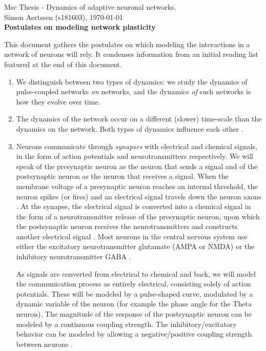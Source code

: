 


Msc Thesis - Dynamics of adaptive neuronal networks. \\
Simon Aertssen (s181603), \today \\ 

{\large \textbf{Postulates on modeling network plasticity}}

This document gathers the postulates on which modeling the interactions in a network of neurons will rely. It condenses information from an initial reading list featured at the end of this document.

\begin{enumerate}
\item We distinguish between two types of dynamics: we study the dynamics of pulse-coupled networks \textsl{on} networks, and the dynamics \textsl{of} such networks is how they evolve over time.

\item The dynamics of the network occur on a different (slower) time-scale than the dynamics on the network. Both types of dynamics influence each other \cite{AdaptiveNetworks2009}.

\item Neurons communicate through \textsl{synapses} with electrical and chemical signals, in the form of action potentials and neurotransmitters respectively. We will speak of the presynaptic neuron as the neuron that sends a signal and of the postsynaptic neuron as the neuron that receives a signal. When the membrane voltage of a presynaptic neuron reaches an internal threshold, the neuron spikes (or fires) and an electrical signal travels down the neuron axons \cite{IntroductionModelingDynamics}. At the synapse, the electrical signal is converted into a chemical signal in the form of a neurotransmitter release of the presynaptic neuron, upon which the postsynaptic neuron receives the neurotransmitters and constructs another electrical signal \cite{ActionPotentialsAndSynapses}. Most neurons in the central nervous system use either the excitatory neurotransmitter glutamate (AMPA or NMDA) or the inhibitory neurotransmitter GABA \cite{MathFoundationNeuroscience, Zhang2012}. 

As signals are converted from electrical to chemical and back, we will model the communication process as entirely electrical, consisting solely of action potentials. These will be modeled by a pulse-shaped curve, modulated by a dynamic variable of the neuron (for example the phase angle for the Theta neuron). The magnitude of the response of the postsynaptic neuron can be modeled by a continuous coupling strength. The inhibitory/excitatory behavior can be modeled by allowing a negative/positive coupling strength between neurons \cite{Luke2013, Martens2020, Montbrio2015, OttAntonsen2017}.


\end{enumerate}
